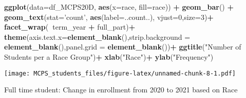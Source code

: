 \documentclass[]{article}
\newenvironment{Shaded}{\begin{snugshade}}{\end{snugshade}}
\newcommand{\CommentTok}[1]{\textcolor[rgb]{0.56,0.35,0.01}{\textit{#1}}}
\newcommand{\DataTypeTok}[1]{\textcolor[rgb]{0.13,0.29,0.53}{#1}}
\newcommand{\DecValTok}[1]{\textcolor[rgb]{0.00,0.00,0.81}{#1}}
\newcommand{\KeywordTok}[1]{\textcolor[rgb]{0.13,0.29,0.53}{\textbf{#1}}}
\newcommand{\NormalTok}[1]{#1}
\newcommand{\OperatorTok}[1]{\textcolor[rgb]{0.81,0.36,0.00}{\textbf{#1}}}
\newcommand{\OtherTok}[1]{\textcolor[rgb]{0.56,0.35,0.01}{#1}}
\newcommand{\StringTok}[1]{\textcolor[rgb]{0.31,0.60,0.02}{#1}}
\begin{document}
\begin{Shaded}
\begin{Highlighting}[]
\KeywordTok{ggplot}\NormalTok{(}\DataTypeTok{data=}\NormalTok{df_MCPS20D, }\KeywordTok{aes}\NormalTok{(}\DataTypeTok{x=}\NormalTok{race, }\DataTypeTok{fill=}\NormalTok{race)) }\OperatorTok{+}
\StringTok{      }\KeywordTok{geom_bar}\NormalTok{() }\OperatorTok{+}
\StringTok{      }\KeywordTok{geom_text}\NormalTok{(}\DataTypeTok{stat=}\StringTok{'count'}\NormalTok{, }\KeywordTok{aes}\NormalTok{(}\DataTypeTok{label=}\NormalTok{..count..), }\DataTypeTok{vjust=}\DecValTok{0}\NormalTok{,}\DataTypeTok{size=}\DecValTok{3}\NormalTok{)}\OperatorTok{+}
\StringTok{      }\KeywordTok{facet_wrap}\NormalTok{(}\OperatorTok{~}\NormalTok{term_year }\OperatorTok{+}\StringTok{ }\NormalTok{full_part)}\OperatorTok{+}
\StringTok{      }\KeywordTok{theme}\NormalTok{(}\DataTypeTok{axis.text.x=}\KeywordTok{element_blank}\NormalTok{(),}\DataTypeTok{strip.background =} \KeywordTok{element_blank}\NormalTok{(),}\DataTypeTok{panel.grid =} \KeywordTok{element_blank}\NormalTok{())}\OperatorTok{+}
\StringTok{      }\KeywordTok{ggtitle}\NormalTok{(}\StringTok{"Number of Students per a Race Group"}\NormalTok{)}\OperatorTok{+}
\StringTok{      }\KeywordTok{xlab}\NormalTok{(}\StringTok{"Race"}\NormalTok{)}\OperatorTok{+}
\StringTok{      }\KeywordTok{ylab}\NormalTok{(}\StringTok{"Frequency"}\NormalTok{)}
\end{Highlighting}
\end{Shaded}

\texttt{[image: MCPS\_students\_files/figure-latex/unnamed-chunk-8-1.pdf]}

Full time student: Change in enrollment from 2020 to 2021 based on Race

\begin{Shaded}
\end{Shaded}
\end{document}
